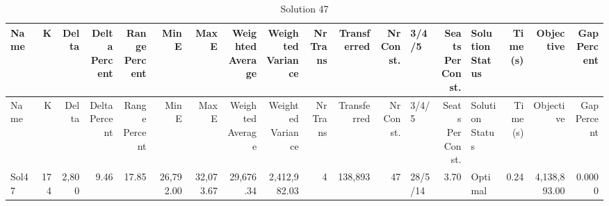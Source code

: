\documentclass[a4paper]{article}
\begin{document}
{\scriptsize
\begin{longtable}{lrrrrrrrrrrrlrlrrr}
\caption{Solution 47}
\\ \toprule
Name &K &Delta &\shortstack{Delta\\Percent} &\shortstack{Range\\Percent} &Min E &Max E &\shortstack{Weighted\\Average} &\shortstack{Weighted\\Variance} &\shortstack{Nr\\Trans} &Transferred &\shortstack{Nr\\Const.} &3/4/5 &\shortstack{Seats\\Per\\Const.} &\shortstack{Solution\\Status} &\shortstack{Time\\(s)} &Objective &\shortstack{Gap\\Percent} \\ \midrule
\endfirsthead
\toprule
Name &K &Delta &\shortstack{Delta\\Percent} &\shortstack{Range\\Percent} &Min E &Max E &\shortstack{Weighted\\Average} &\shortstack{Weighted\\Variance} &\shortstack{Nr\\Trans} &Transferred &\shortstack{Nr\\Const.} &3/4/5 &\shortstack{Seats\\Per\\Const.} &\shortstack{Solution\\Status} &\shortstack{Time\\(s)} &Objective &\shortstack{Gap\\Percent} \\ \midrule
\endhead
\bottomrule
\endfoot
Sol47&174&2,800& 9.46&17.85&26,792.00&32,073.67&29,676.34&2,412,982.03&4&138,893&47&28/5/14& 3.70&Optimal& 0.24&4,138,893.00&0.0000\\ 
\end{longtable}

}
\end{document}
